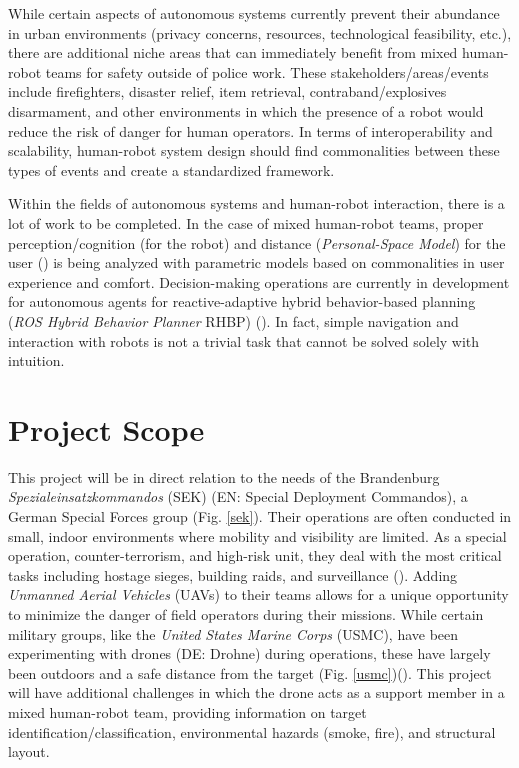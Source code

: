 While certain aspects of autonomous systems currently prevent their abundance in urban environments (privacy concerns, resources, technological feasibility, etc.), there are additional niche areas that can immediately benefit from mixed human-robot teams for safety outside of police work. These stakeholders/areas/events include firefighters, disaster relief, item retrieval, contraband/explosives disarmament, and other environments in which the presence of a robot would reduce the risk of danger for human operators. In terms of interoperability and scalability, human-robot system design should find commonalities between these types of events and create a standardized framework.
\smallskip

Within the fields of autonomous systems and human-robot interaction, there is a lot of work to be completed. In the case of mixed human-robot teams, proper perception/cognition (for the robot) and distance (\textit{Personal-Space Model}) for the user (\cite{cuijpers}) is being analyzed with parametric models based on commonalities in user experience and comfort. Decision-making operations are currently in development for autonomous agents for reactive-adaptive hybrid behavior-based planning (\textit{ROS Hybrid Behavior Planner} RHBP)  (\cite{hrabia1}). In fact, simple navigation and interaction with robots is not a trivial task that cannot be solved solely with intuition. 
\smallskip

\section{Project Scope}
This project will be in direct relation to the needs of the Brandenburg  \textit{Spezialeinsatzkommandos} (SEK) (EN: Special Deployment Commandos), a German Special Forces group (Fig. \ref{sek}). Their operations are often conducted in small, indoor environments where mobility and visibility are limited. As a special operation, counter-terrorism, and high-risk unit, they deal with the most critical tasks including hostage sieges, building raids, and surveillance (\cite{SEK1}). Adding \textit{Unmanned Aerial Vehicles} (UAVs) to their teams allows for a unique opportunity to minimize the danger of field operators during their missions. While certain military groups, like the \textit{United States Marine Corps} (USMC), have been experimenting with drones (DE: Drohne) during operations, these have largely been outdoors and a safe distance from the target (Fig. \ref{usmc})(\cite{USMC1}). This project will have additional challenges in which the drone acts as a support member in a mixed human-robot team, providing information on target identification/classification, environmental hazards (smoke, fire), and structural layout. 
\smallskip



